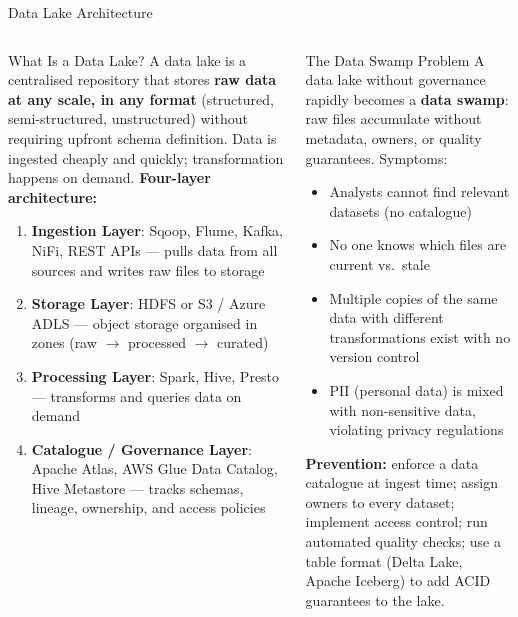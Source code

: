 \documentclass[aspectratio=169,10pt]{beamer}
\begin{document}
\begin{frame}{Data Lake Architecture}
  \begin{columns}[T]
      \begin{block}{What Is a Data Lake?}
        A data lake is a centralised repository that stores \textbf{raw data at any scale, in any format} (structured, semi-structured, unstructured) without requiring upfront schema definition.  Data is ingested cheaply and quickly; transformation happens on demand.
        \vspace{4pt}
        \textbf{Four-layer architecture:}
        \begin{enumerate}
          \item \textbf{Ingestion Layer}: Sqoop, Flume, Kafka, NiFi, REST APIs — pulls data from all sources and writes raw files to storage
          \item \textbf{Storage Layer}: HDFS or S3 / Azure ADLS — object storage organised in zones (raw $\to$ processed $\to$ curated)
          \item \textbf{Processing Layer}: Spark, Hive, Presto — transforms and queries data on demand
          \item \textbf{Catalogue / Governance Layer}: Apache Atlas, AWS Glue Data Catalog, Hive Metastore — tracks schemas, lineage, ownership, and access policies
        \end{enumerate}
      \end{block}

      \begin{alertblock}{The Data Swamp Problem}
        \small A data lake without governance rapidly becomes a \textbf{data swamp}: raw files accumulate without metadata, owners, or quality guarantees.  Symptoms:
        \begin{itemize}
          \item Analysts cannot find relevant datasets (no catalogue)
          \item No one knows which files are current vs.\ stale
          \item Multiple copies of the same data with different transformations exist with no version control
          \item PII (personal data) is mixed with non-sensitive data, violating privacy regulations
        \end{itemize}
        \vspace{4pt}
        \textbf{Prevention:} enforce a data catalogue at ingest time; assign owners to every dataset; implement access control; run automated quality checks; use a table format (Delta Lake, Apache Iceberg) to add ACID guarantees to the lake.
      \end{alertblock}
  \end{columns}
\end{frame}
\end{document}
